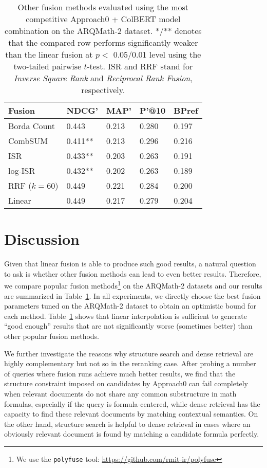 \documentclass[11pt]{article}
\begin{document}
\begin{table}
\small
\centering
\caption{\label{tab:fusion_other_than_linear}
Other fusion methods evaluated using the most competitive Approach0 + ColBERT model combination on the ARQMath-2 dataset.
*/** denotes that the compared row performs significantly weaker than the linear fusion at $p<$ 0.05/0.01 level using the two-tailed pairwise $t$-test.
ISR and RRF stand for \textit{Inverse Square Rank} and \textit{Reciprocal Rank Fusion}, respectively.
}
\begin{tabular}{l|llll}
\toprule
\bf Fusion & NDCG' & MAP' & P'@10 & BPref 
\\ \midrule
Borda Count & 0.443 & 0.213 & 0.280 & 0.197 \\
CombSUM & 0.411** & 0.213 & 0.296 & 0.216 \\ 
ISR & 0.433** & 0.203 & 0.263 & 0.191 \\
log-ISR & 0.432** & 0.202 & 0.263 & 0.189 \\ 
RRF ($k=60$) & 0.449 & 0.221 & 0.284 & 0.200 \\
\midrule
Linear & 0.449& 0.217&0.279& 0.204 \\
\bottomrule
\end{tabular}
\end{table}

\section{Discussion}
\label{sect:discussion}
Given that linear fusion is able to produce such good results, a natural question to ask is whether other fusion methods can lead to even better results.
Therefore, we compare popular fusion methods\footnote{We use the \texttt{polyfuse} tool: \url{https://github.com/rmit-ir/polyfuse}} on the ARQMath-2 datasets and our results are summarized in Table~\ref{tab:fusion_other_than_linear}.
In all experiments, we directly choose the best fusion parameters tuned on the ARQMath-2 dataset to obtain an optimistic bound for each method.
Table~\ref{tab:fusion_other_than_linear} shows that linear interpolation is sufficient to generate ``good enough'' results that are not significantly worse (sometimes better) than other popular fusion methods.

We further investigate the reasons why structure search and dense retrieval are highly complementary but not so in the reranking case.
After probing a number of queries where fusion runs achieve much better results, we find that the structure constraint imposed on candidates by Approach0 can fail completely when relevant documents do not share any common substructure in math formulas, especially if the query is formula-centered, while dense retrieval has the capacity to find these relevant documents by matching contextual semantics.
On the other hand, structure search is helpful to dense retrieval in cases where an obviously relevant document is found by matching a candidate formula perfectly.
\end{document}
